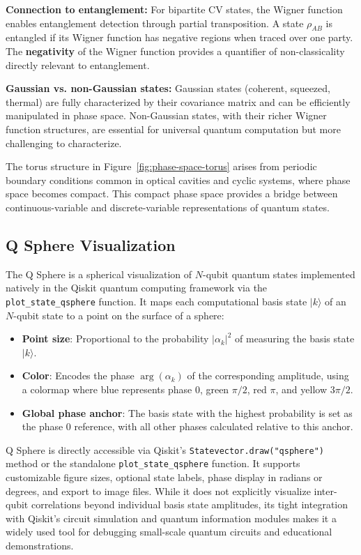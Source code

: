 \documentclass[%
 amsmath,amssymb,
 aps,
rmp,
]{revtex4-2}
\begin{document}
\textbf{Connection to entanglement:} For bipartite CV states, the Wigner function enables entanglement detection through partial transposition. A state $\rho_{AB}$ is entangled if its Wigner function has negative regions when traced over one party. The \textbf{negativity} of the Wigner function provides a quantifier of non-classicality directly relevant to entanglement.

\textbf{Gaussian vs. non-Gaussian states:} Gaussian states (coherent, squeezed, thermal) are fully characterized by their covariance matrix and can be efficiently manipulated in phase space. Non-Gaussian states, with their richer Wigner function structures, are essential for universal quantum computation but more challenging to characterize.

The torus structure in Figure~\ref{fig:phase-space-torus} arises from periodic boundary conditions common in optical cavities and cyclic systems, where phase space becomes compact. This compact phase space provides a bridge between continuous-variable and discrete-variable representations of quantum states.

\subsection{Q Sphere Visualization}
\label{sec:qsphere}

The Q Sphere is a spherical visualization of $N$-qubit quantum states implemented natively in the Qiskit quantum computing framework \cite{Qiskit} via the \texttt{plot\_state\_qsphere} function. It maps each computational basis state $|k\rangle$ of an $N$-qubit state to a point on the surface of a sphere:
\begin{itemize}
    \item \textbf{Point size}: Proportional to the probability $|\alpha_k|^2$ of measuring the basis state $|k\rangle$.
    \item \textbf{Color}: Encodes the phase $\arg(\alpha_k)$ of the corresponding amplitude, using a colormap where blue represents phase 0, green $\pi/2$, red $\pi$, and yellow $3\pi/2$.
    \item \textbf{Global phase anchor}: The basis state with the highest probability is set as the phase 0 reference, with all other phases calculated relative to this anchor.
\end{itemize}

Q Sphere is directly accessible via Qiskit's \texttt{Statevector.draw("qsphere")} method or the standalone \texttt{plot\_state\_qsphere} function. It supports customizable figure sizes, optional state labels, phase display in radians or degrees, and export to image files. While it does not explicitly visualize inter-qubit correlations beyond individual basis state amplitudes, its tight integration with Qiskit's circuit simulation and quantum information modules makes it a widely used tool for debugging small-scale quantum circuits and educational demonstrations.
\end{document}
